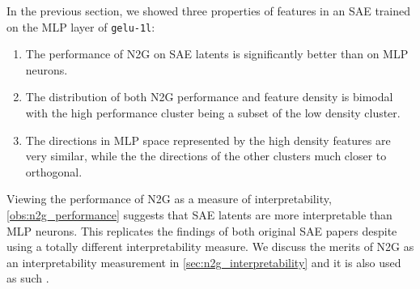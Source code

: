 In the previous section, we showed three properties of features in an \ac{SAE} trained on the \ac{MLP} layer of \texttt{gelu-1l}: 
\begin{enumerate}[ref={observation~\arabic*}]
    \item The performance of \ac{N2G} on \ac{SAE} latents is significantly better than on \ac{MLP} neurons.\label{obs:n2g_performance}
    \item The distribution of both \ac{N2G} performance and feature density is bimodal with the high performance cluster being a subset of the low density cluster.\label{obs:bimodal}
    \item The directions in \ac{MLP} space represented by the high density features are very similar, while the the directions of the other clusters much closer to orthogonal.\label{obs:directions}
\end{enumerate}
Viewing the performance of \ac{N2G} as a measure of interpretability, \ref{obs:n2g_performance} suggests that \ac{SAE} latents are more interpretable than \ac{MLP} neurons.
This replicates the findings of both original \ac{SAE} papers \parencite{bricken_towards_2023}\parencite{cunningham_sparse_2023} despite using a totally different interpretability measure.
We discuss the merits of \ac{N2G} as an interpretability measurement in \autoref{sec:n2g_interpretability} and it is also used as such \textcite{gao_scaling_2024}.


